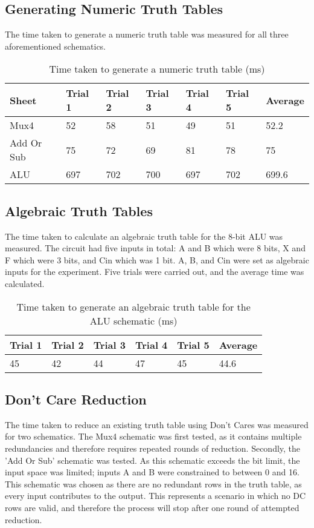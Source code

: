 \subsection{Generating Numeric Truth Tables}
The time taken to generate a numeric truth table was measured for all three aforementioned schematics.
\begin{table}[!ht]
    \centering
    \begin{tabular}{|l|l|l|l|l|l|l|}
    \hline
        Sheet & Trial 1 & Trial 2 & Trial 3 & Trial 4 & Trial 5 & Average \\ \hline
        Mux4 & 52 & 58 & 51 & 49 & 51 & 52.2 \\ \hline
        Add Or Sub & 75 & 72 & 69 & 81 & 78 & 75 \\ \hline
        ALU & 697 & 702 & 700 & 697 & 702 & 699.6 \\ \hline
    \end{tabular}
    \caption{Time taken to generate a numeric truth table (ms)}
    \label{tab:timeTT}
\end{table}

\subsection{Algebraic Truth Tables}
The time taken to calculate an algebraic truth table for the 8-bit ALU was measured. The circuit had five inputs in total: A and B which were 8 bits, X and F which were 3 bits, and Cin which was 1 bit. A, B, and Cin were set as algebraic inputs for the experiment. Five trials were carried out, and the average time was calculated. 

\begin{table}[!ht]
    \centering
    \begin{tabular}{|l|l|l|l|l|l|}
    \hline
        Trial 1 & Trial 2 & Trial 3 & Trial 4 & Trial 5 & Average \\ \hline
        45 & 42 & 44 & 47 & 45 & 44.6\\ \hline
    \end{tabular}
    \caption{Time taken to generate an algebraic truth table for the ALU schematic (ms)}
    \label{tab:timeAlgTT}
\end{table}

\subsection{Don't Care Reduction}
The time taken to reduce an existing truth table using Don't Cares was measured for two schematics. The Mux4 schematic was first tested, as it contains multiple redundancies and therefore requires repeated rounds of reduction. Secondly, the 'Add Or Sub' schematic was tested. As this schematic exceeds the bit limit, the input space was limited; inputs A and B were constrained to between 0 and 16. This schematic was chosen as there are no redundant rows in the truth table, as every input contributes to the output. This represents a scenario in which no DC rows are valid, and therefore the process will stop after one round of attempted reduction.

